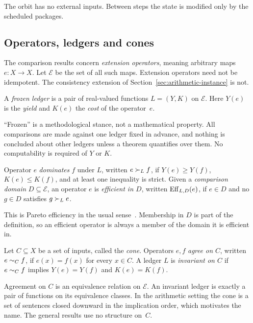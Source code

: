 The orbit has no external inputs. Between steps the state is modified only by the scheduled packages.

\subsection{Operators, ledgers and cones}

The comparison results concern \emph{extension operators}, meaning arbitrary maps $e\colon X\to X$. Let $\mathcal{E}$ be the set of all such maps. Extension operators need not be idempotent. The consistency extension of Section~\ref{sec:arithmetic-instance} is not.

\begin{definition}\label{def:ledger}
A \emph{frozen ledger} is a pair of real-valued functions $L=(Y,K)$ on $\mathcal{E}$. Here $Y(e)$ is the \emph{yield} and $K(e)$ the \emph{cost} of the operator~$e$.
\end{definition}

``Frozen'' is a methodological stance, not a mathematical property. All comparisons are made against one ledger fixed in advance, and nothing is concluded about other ledgers unless a theorem quantifies over them. No computability is required of $Y$ or $K$.

\begin{definition}\label{def:efficiency}
Operator $e$ \emph{dominates} $f$ under $L$, written $e\succ_L f$, if $Y(e)\ge Y(f)$, $K(e)\le K(f)$, and at least one inequality is strict. Given a \emph{comparison domain} $D\subseteq\mathcal{E}$, an operator $e$ is \emph{efficient in $D$}, written $\operatorname{Eff}_{L,D}(e)$, if $e\in D$ and no $g\in D$ satisfies $g\succ_L e$.
\end{definition}

This is Pareto efficiency in the usual sense~\cite{MasColellWhinstonGreen1995}. Membership in $D$ is part of the definition, so an efficient operator is always a member of the domain it is efficient in.

\begin{definition}\label{def:cone}
Let $C\subseteq X$ be a set of inputs, called the \emph{cone}. Operators $e,f$ \emph{agree on $C$}, written $e\mathrel{\sim_{C}}f$, if $e(x)=f(x)$ for every $x\in C$. A ledger $L$ is \emph{invariant on $C$} if $e\mathrel{\sim_{C}}f$ implies $Y(e)=Y(f)$ and $K(e)=K(f)$.
\end{definition}

Agreement on $C$ is an equivalence relation on $\mathcal{E}$. An invariant ledger is exactly a pair of functions on its equivalence classes. In the arithmetic setting the cone is a set of sentences closed downward in the implication order, which motivates the name. The general results use no structure on~$C$.

